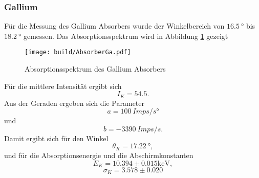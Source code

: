\subsubsection{Gallium}
Für die Messung des Gallium Absorbers wurde der Winkelbereich von $\qty{16.5}{°}$ bis $\qty{18.2}{°}$ gemessen.
Das Absorptionsspektrum wird in Abbildung \ref{fig:AbGa} gezeigt
\begin{figure}[H]
    \centering
    \texttt{[image: build/AbsorberGa.pdf]}
    \caption{Absorptionsspektrum des Gallium Absorbers}
    \label{fig:AbGa}
\end{figure}
\noindent Für die mittlere Intensität ergibt sich
\begin{equation*}
    I_K = 54.5.
\end{equation*}
Aus der Geraden ergeben sich die Parameter
\begin{equation*}
    a = \qty{100}{Imps/s°}
\end{equation*}
und
\begin{equation*}
    b = \qty{-3390}{Imps/s.}
\end{equation*}
Damit ergibt sich für den Winkel 
\begin{equation*}
    \theta_K = \qty{17.22}{°},
\end{equation*}
und für die Absorptionsenergie und die Abschirmkonstanten
\begin{equation*}
     E_K = 10.394 \pm 0.015 \unit{\kilo\electronvolt},
\end{equation*}
\begin{equation*}
    \sigma_K = 3.578 \pm 0.020
\end{equation*}

